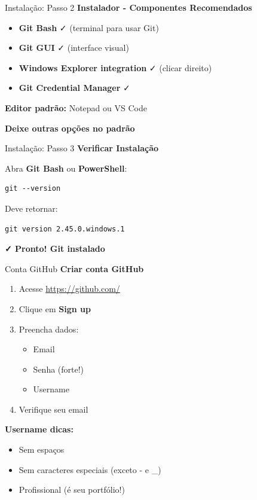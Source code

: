 \documentclass[11pt]{beamer}
\begin{document}
\begin{frame}{Instalação: Passo 2}
\textbf{Instalador - Componentes Recomendados}

\begin{itemize}
    \item \textbf{Git Bash} ✓ (terminal para usar Git)
    \item \textbf{Git GUI} ✓ (interface visual)
    \item \textbf{Windows Explorer integration} ✓ (clicar direito)
    \item \textbf{Git Credential Manager} ✓
\end{itemize}

\vspace{0.3cm}

\textbf{Editor padrão:} Notepad ou VS Code

\vspace{0.3cm}

\textbf{Deixe outras opções no padrão}
\end{frame}

\begin{frame}{Instalação: Passo 3}
\textbf{Verificar Instalação}

Abra \textbf{Git Bash} ou \textbf{PowerShell}:

\begin{lstlisting}
git --version
\end{lstlisting}

Deve retornar:
\begin{lstlisting}
git version 2.45.0.windows.1
\end{lstlisting}

\vspace{0.5cm}

\textbf{✓ Pronto! Git instalado}
\end{frame}

\begin{frame}{Conta GitHub}
\textbf{Criar conta GitHub}

\begin{enumerate}
    \item Acesse \url{https://github.com/}
    \item Clique em \textbf{Sign up}
    \item Preencha dados:
    \begin{itemize}
        \item Email
        \item Senha (forte!)
        \item Username
    \end{itemize}
    \item Verifique seu email
\end{enumerate}

\vspace{0.3cm}

\textbf{Username dicas:}
\begin{itemize}
    \small
    \item Sem espaços
    \item Sem caracteres especiais (exceto - e \_)
    \item Profissional (é seu portfólio!)
\end{itemize}
\end{frame}
\end{document}
